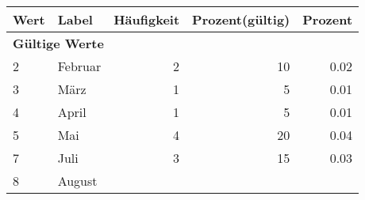      \begin{longtable}{lXrrr}
     \toprule
     \textbf{Wert} & \textbf{Label} & \textbf{Häufigkeit} & \textbf{Prozent(gültig)} & \textbf{Prozent} \\
     \endhead
     \midrule
     \multicolumn{5}{l}{\textbf{Gültige Werte}}\\

     2 &
     \multicolumn{1}{X}{ Februar   } &


       \num{2} &
       \num[round-mode=places,round-precision=2]{10} &
         \num[round-mode=places,round-precision=2]{0.02} \\

     3 &
     \multicolumn{1}{X}{ März   } &


       \num{1} &
       \num[round-mode=places,round-precision=2]{5} &
         \num[round-mode=places,round-precision=2]{0.01} \\

     4 &
     \multicolumn{1}{X}{ April   } &


       \num{1} &
       \num[round-mode=places,round-precision=2]{5} &
         \num[round-mode=places,round-precision=2]{0.01} \\

     5 &
     \multicolumn{1}{X}{ Mai   } &


       \num{4} &
       \num[round-mode=places,round-precision=2]{20} &
         \num[round-mode=places,round-precision=2]{0.04} \\

     7 &
     \multicolumn{1}{X}{ Juli   } &


       \num{3} &
       \num[round-mode=places,round-precision=2]{15} &
         \num[round-mode=places,round-precision=2]{0.03} \\

     8 &
     \multicolumn{1}{X}{ August   } &



\end{longtable}
